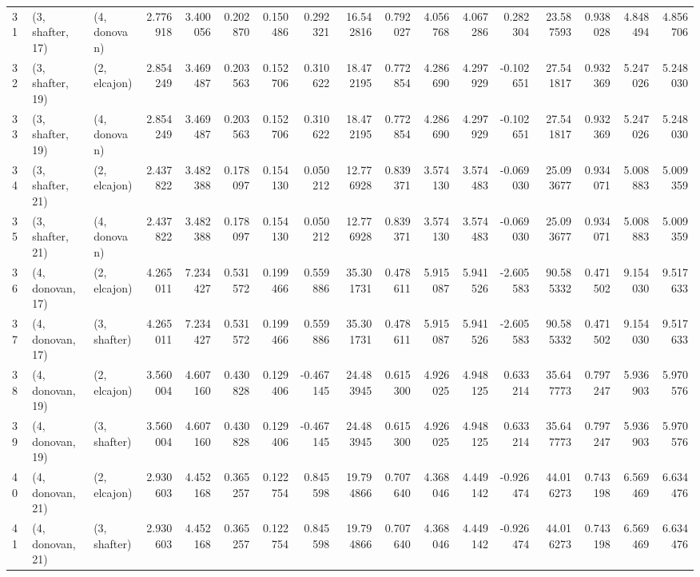 \begin{tabular}{lllrrrrrrrrrrrrrr}
31 &  (3, shafter, 17) &     (4, donovan) &  2.776918 &  3.400056 &   0.202870 &  0.150486 &  0.292321 &  16.542816 &  0.792027 &   4.056768 &  4.067286 &  0.282304 &  23.587593 &  0.938028 &  4.848494 &  4.856706 \\
32 &  (3, shafter, 19) &     (2, elcajon) &  2.854249 &  3.469487 &   0.203563 &  0.152706 &  0.310622 &  18.472195 &  0.772854 &   4.286690 &  4.297929 & -0.102651 &  27.541817 &  0.932369 &  5.247026 &  5.248030 \\
33 &  (3, shafter, 19) &     (4, donovan) &  2.854249 &  3.469487 &   0.203563 &  0.152706 &  0.310622 &  18.472195 &  0.772854 &   4.286690 &  4.297929 & -0.102651 &  27.541817 &  0.932369 &  5.247026 &  5.248030 \\
34 &  (3, shafter, 21) &     (2, elcajon) &  2.437822 &  3.482388 &   0.178097 &  0.154130 &  0.050212 &  12.776928 &  0.839371 &   3.574130 &  3.574483 & -0.069030 &  25.093677 &  0.934071 &  5.008883 &  5.009359 \\
35 &  (3, shafter, 21) &     (4, donovan) &  2.437822 &  3.482388 &   0.178097 &  0.154130 &  0.050212 &  12.776928 &  0.839371 &   3.574130 &  3.574483 & -0.069030 &  25.093677 &  0.934071 &  5.008883 &  5.009359 \\
36 &  (4, donovan, 17) &     (2, elcajon) &  4.265011 &  7.234427 &   0.531572 &  0.199466 &  0.559886 &  35.301731 &  0.478611 &   5.915087 &  5.941526 & -2.605583 &  90.585332 &  0.471502 &  9.154030 &  9.517633 \\
37 &  (4, donovan, 17) &     (3, shafter) &  4.265011 &  7.234427 &   0.531572 &  0.199466 &  0.559886 &  35.301731 &  0.478611 &   5.915087 &  5.941526 & -2.605583 &  90.585332 &  0.471502 &  9.154030 &  9.517633 \\
38 &  (4, donovan, 19) &     (2, elcajon) &  3.560004 &  4.607160 &   0.430828 &  0.129406 & -0.467145 &  24.483945 &  0.615300 &   4.926025 &  4.948125 &  0.633214 &  35.647773 &  0.797247 &  5.936903 &  5.970576 \\
39 &  (4, donovan, 19) &     (3, shafter) &  3.560004 &  4.607160 &   0.430828 &  0.129406 & -0.467145 &  24.483945 &  0.615300 &   4.926025 &  4.948125 &  0.633214 &  35.647773 &  0.797247 &  5.936903 &  5.970576 \\
40 &  (4, donovan, 21) &     (2, elcajon) &  2.930603 &  4.452168 &   0.365257 &  0.122754 &  0.845598 &  19.794866 &  0.707640 &   4.368046 &  4.449142 & -0.926474 &  44.016273 &  0.743198 &  6.569469 &  6.634476 \\
41 &  (4, donovan, 21) &     (3, shafter) &  2.930603 &  4.452168 &   0.365257 &  0.122754 &  0.845598 &  19.794866 &  0.707640 &   4.368046 &  4.449142 & -0.926474 &  44.016273 &  0.743198 &  6.569469 &  6.634476 \\

\end{tabular}
